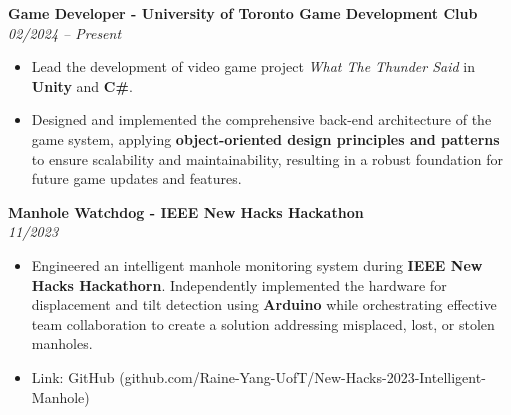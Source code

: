 \documentclass[a4paper,10pt]{article}
\begin{document}
\begin{multicols}{2}
\noindent
\textbf{Game Developer - University of Toronto Game Development Club} \\
\textit{02/2024 -- Present} \\
\begin{itemize}
    \item Lead the development of video game project \textit{What The Thunder Said} in \textbf{Unity} and \textbf{C\#}.
    \item Designed and implemented the comprehensive back-end architecture of the game system, applying \textbf{object-oriented design principles and patterns} to ensure scalability and maintainability, resulting in a robust foundation for future game updates and features.
\end{itemize}

\vspace{0.25cm}

\noindent
\textbf{Manhole Watchdog - IEEE New Hacks Hackathon} \\
\textit{11/2023} \\
\begin{itemize}
    \item Engineered an intelligent manhole monitoring system during \textbf{IEEE New Hacks Hackathorn}. Independently implemented the hardware for displacement and tilt detection using \textbf{Arduino} while orchestrating effective team collaboration to create a solution addressing misplaced, lost, or stolen manholes.
    \item Link: GitHub (github.com/Raine-Yang-UofT/New-Hacks-2023-Intelligent-Manhole)
\end{itemize}
\end{multicols}
\end{document}

